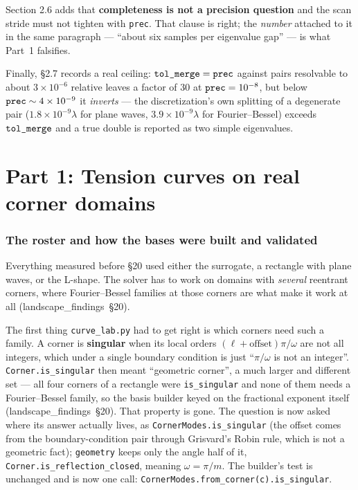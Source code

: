\documentclass[11pt]{article}
\newcommand{\file}[1]{\texttt{#1}}
\newcommand{\lf}[1]{(landscape\_findings~\S#1)}
\newcommand{\lam}{\lambda}
\begin{document}
Section 2.6 adds that \textbf{completeness is not a precision question} and the scan stride
must not tighten with \verb|prec|. That clause is right; the \emph{number} attached to it in
the same paragraph --- ``about six samples per eigenvalue gap'' --- is what Part~1 falsifies.

Finally, \S2.7 records a real ceiling: $\verb|tol_merge| = \verb|prec|$ against pairs
resolvable to about $3\times10^{-6}$ relative leaves a factor of 30 at $\verb|prec|=10^{-8}$,
but below $\verb|prec|\sim 4\times10^{-9}$ it \emph{inverts} --- the discretization's own
splitting of a degenerate pair ($1.8\times10^{-9}\lam$ for plane waves,
$3.9\times10^{-9}\lam$ for Fourier--Bessel) exceeds $\verb|tol_merge|$ and a true double is
reported as two simple eigenvalues.

\part*{Part 1: Tension curves on real corner domains}
\setcounter{section}{2}

\section{The roster and how the bases were built and validated}
\label{sec:roster}

Everything measured before \S20 used either the surrogate, a rectangle with plane waves, or the
L-shape. The solver has to work on domains with \emph{several} reentrant corners, where
Fourier--Bessel families at those corners are what make it work at all \lf{20}.

The first thing \file{curve\_lab.py} had to get right is which corners need such a family. A
corner is \textbf{singular} when its local orders $(\ell+\text{offset})\pi/\omega$ are not all
integers, which under a single boundary condition is just ``$\pi/\omega$ is not an integer''.
\verb|Corner.is_singular| then meant ``geometric corner'', a much larger and different set ---
all four corners of a rectangle were \verb|is_singular| and none of them needs a
Fourier--Bessel family, so the basis builder keyed on the fractional exponent itself \lf{20}.
That property is gone. The question is now asked where its answer actually lives, as
\verb|CornerModes.is_singular| (the offset comes from the boundary-condition pair through
Grisvard's Robin rule, which is not a geometric fact); \verb|geometry| keeps only the angle
half of it, \verb|Corner.is_reflection_closed|, meaning $\omega=\pi/m$. The builder's test is
unchanged and is now one call: \verb|CornerModes.from_corner(c).is_singular|.
\end{document}

